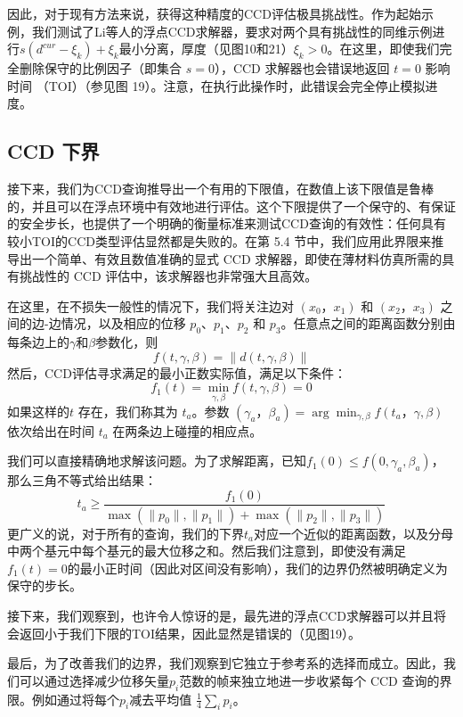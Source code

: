 因此，对于现有方法来说，获得这种精度的CCD评估极具挑战性。作为起始示例，我们测试了Li等人的浮点CCD求解器，要求对两个具有挑战性的同维示例进行$s(d^{cur} − \xi_k)+ \xi_k$最小分离，厚度（见图10和21）$\xi_k>0$。在这里，即使我们完全删除保守的比例因子（即集合 $s = 0$），CCD 求解器也会错误地返回 $t = 0$ 影响时间 （TOI）（参见图 19）。注意，在执行此操作时，此错误会完全停止模拟进度。

\subsection{CCD 下界}

接下来，我们为CCD查询推导出一个有用的下限值，在数值上该下限值是鲁棒的，并且可以在浮点环境中有效地进行评估。这个下限提供了一个保守的、有保证的安全步长，也提供了一个明确的衡量标准来测试CCD查询的有效性：任何具有较小TOI的CCD类型评估显然都是失败的。在第 5.4 节中，我们应用此界限来推导出一个简单、有效且数值准确的显式 CCD 求解器，即使在薄材料仿真所需的具有挑战性的 CCD 评估中，该求解器也非常强大且高效。

在这里，在不损失一般性的情况下，我们将关注边对 $(x_0 ，x_1)$ 和 $(x_2，x_3)$ 之间的边-边情况，以及相应的位移 $p_0$、$p_1$、$p_2$ 和 $p_3$。任意点之间的距离函数分别由每条边上的$\gamma$和$\beta$参数化，则
\begin{equation}
  f(t, \gamma, \beta) = \| d(t, \gamma, \beta)\|
\end{equation}
然后，CCD评估寻求满足的最小正数实际值，满足以下条件：
\begin{equation}
  f_1(t) = \min_{\gamma,\beta} f(t, \gamma, \beta) = 0
\end{equation}
如果这样的$t$ 存在，我们称其为 $t_a$。参数 $(\gamma_a， \beta_ a) = \arg\min_{\gamma, \beta}f(t_a， \gamma, \beta)$依次给出在时间 $t_a$ 在两条边上碰撞的相应点。

我们可以直接精确地求解该问题。为了求解距离，已知$f_1(0)\le f(0, \gamma_a, \beta_a)$，那么三角不等式给出结果：
\begin{equation}
  t_a \ge \frac{f_1(0)}{\max(\|p_0\|, \|p_1\|) + 
  \max(\|p_2\|, \|p_3\|)}
\end{equation}
更广义的说，对于所有的查询，我们的下界$t_a$对应一个近似的距离函数，以及分母中两个基元中每个基元的最大位移之和。然后我们注意到，即使没有满足$f_1(t)= 0$的最小正时间（因此对区间没有影响），我们的边界仍然被明确定义为保守的步长。

接下来，我们观察到，也许令人惊讶的是，最先进的浮点CCD求解器可以并且将会返回小于我们下限的TOI结果，因此显然是错误的（见图19）。

最后，为了改善我们的边界，我们观察到它独立于参考系的选择而成立。因此，我们可以通过选择减少位移矢量$p_i$范数的帧来独立地进一步收紧每个 CCD 查询的界限。例如通过将每个$p_i$减去平均值 $\frac{1}{4}\sum_ip_i$。

